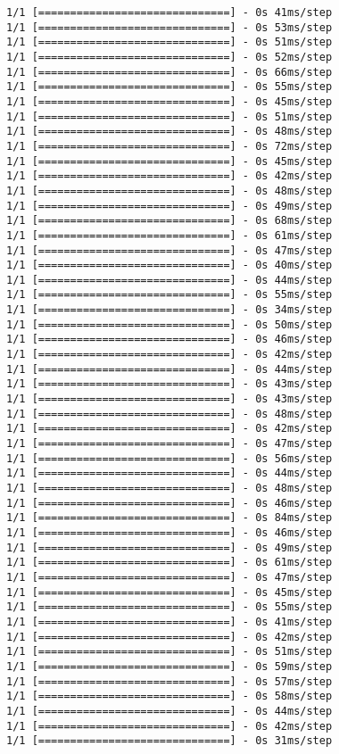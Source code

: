 \documentclass[11pt]{article}
\begin{document}
\begin{Verbatim}[commandchars=\\\{\}]
1/1 [==============================] - 0s 41ms/step
1/1 [==============================] - 0s 53ms/step
1/1 [==============================] - 0s 51ms/step
1/1 [==============================] - 0s 52ms/step
1/1 [==============================] - 0s 66ms/step
1/1 [==============================] - 0s 55ms/step
1/1 [==============================] - 0s 45ms/step
1/1 [==============================] - 0s 51ms/step
1/1 [==============================] - 0s 48ms/step
1/1 [==============================] - 0s 72ms/step
1/1 [==============================] - 0s 45ms/step
1/1 [==============================] - 0s 42ms/step
1/1 [==============================] - 0s 48ms/step
1/1 [==============================] - 0s 49ms/step
1/1 [==============================] - 0s 68ms/step
1/1 [==============================] - 0s 61ms/step
1/1 [==============================] - 0s 47ms/step
1/1 [==============================] - 0s 40ms/step
1/1 [==============================] - 0s 44ms/step
1/1 [==============================] - 0s 55ms/step
1/1 [==============================] - 0s 34ms/step
1/1 [==============================] - 0s 50ms/step
1/1 [==============================] - 0s 46ms/step
1/1 [==============================] - 0s 42ms/step
1/1 [==============================] - 0s 44ms/step
1/1 [==============================] - 0s 43ms/step
1/1 [==============================] - 0s 43ms/step
1/1 [==============================] - 0s 48ms/step
1/1 [==============================] - 0s 42ms/step
1/1 [==============================] - 0s 47ms/step
1/1 [==============================] - 0s 56ms/step
1/1 [==============================] - 0s 44ms/step
1/1 [==============================] - 0s 48ms/step
1/1 [==============================] - 0s 46ms/step
1/1 [==============================] - 0s 84ms/step
1/1 [==============================] - 0s 46ms/step
1/1 [==============================] - 0s 49ms/step
1/1 [==============================] - 0s 61ms/step
1/1 [==============================] - 0s 47ms/step
1/1 [==============================] - 0s 45ms/step
1/1 [==============================] - 0s 55ms/step
1/1 [==============================] - 0s 41ms/step
1/1 [==============================] - 0s 42ms/step
1/1 [==============================] - 0s 51ms/step
1/1 [==============================] - 0s 59ms/step
1/1 [==============================] - 0s 57ms/step
1/1 [==============================] - 0s 58ms/step
1/1 [==============================] - 0s 44ms/step
1/1 [==============================] - 0s 42ms/step
1/1 [==============================] - 0s 31ms/step

\end{Verbatim}
\end{document}
